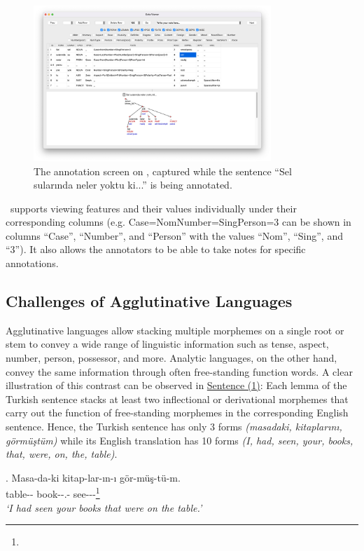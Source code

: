 \begin{figure}[th!]
    \centering
        \includegraphics[width=0.8\textwidth]{figures/boat-v1-march-sample-annotation-mac.png}
        \caption{The annotation screen on \boatvone, captured while the sentence ``Sel sularında neler yoktu ki...'' is being annotated.}
        \label{fig:anno-fig-v1}
\end{figure}

\boatvone\ supports viewing features and their values individually under their corresponding columns (e.g. Case=Nom\textbar Number=Sing\textbar Person=3 can be shown in columns ``Case'', ``Number'', and ``Person'' with the values ``Nom'', ``Sing'', and ``3'').
It also allows the annotators to be able to take notes for specific annotations.

\subsection{Challenges of Agglutinative Languages}
\label{sec:challenges}
Agglutinative languages allow stacking multiple morphemes on a single root or stem to convey a wide range of linguistic information such as tense, aspect, number, person, possessor, and more.
Analytic languages, on the other hand, convey the same information through often free-standing function words.
A clear illustration of this contrast can be observed in \hyperref[trex]{Sentence (1)}: Each lemma of the Turkish sentence stacks at least two inflectional or derivational morphemes that carry out the function of free-standing morphemes in the corresponding English sentence.
Hence, the Turkish sentence has only 3 forms \textit{(masadaki, kitaplarını, görmüştüm)} while its English translation has 10 forms \textit{(I, had, seen, your, books, that, were, on, the, table)}.

\ex.
\label{trex}
Masa-da-ki \hspace*{.573cm}kitap-lar-ın-ı \hspace*{1.8cm}gör-müş-tü-m.\\
table-{\sc \Loc-\Der} book-{\sc \Pl-\Poss.\Second\Sg-\Acc} see-{\sc \Ant-\Pst-\First\Sg}\footnote{\printglossaries}\\
\textit{`I had seen your books that were on the table.'}

